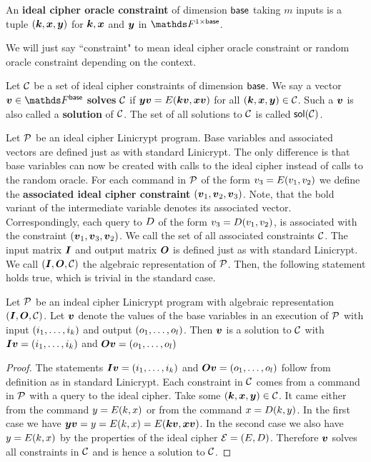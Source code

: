 \begin{defn}
An \textbf{ideal cipher oracle constraint} of dimension $\base$ taking $m$ inputs is a tuple $(\vk, \vx, \vy)$ for
$\vk, \vx$ and $\vy$ in $\F^{1 \times \base}$.
\end{defn}

We will just say ``constraint" to mean ideal cipher oracle constraint or random oracle constraint depending on the context.

\begin{defn}
    Let $\C$ be a set of ideal cipher constraints of dimension $\base$.
    We say a vector $\vv \in \Base$ \textbf{solves} $\C$ if
    $\vy \vv = \E(\vk \vv, \vx \vv)$ for all $(\vk, \vx, \vy) \in \C$.
    Such a $\vv$ is also called a \textbf{solution} of $\C$.
    The set of all solutions to $\C$ is called $\sol(\C)$.
\end{defn}

Let $\P$ be an ideal cipher Linicrypt program.
Base variables and associated vectors are defined just as with standard Linicrypt.
The only difference is that base variables can now be created with calls to the ideal cipher instead of calls to the random oracle.
For each command in $\P$ of the form $v_3 = \E(v_1,v_2)$
we define the \textbf{associated ideal cipher constraint} $(\vv_1, \vv_2, \vv_3)$.
Note, that the bold variant of the intermediate variable denotes its associated vector.
Correspondingly, each query to $\D$ of the form $v_3 = \D(v_1,v_2)$,
is associated with the constraint $(\vv_1, \vv_3, \vv_2)$.
We call the set of all associated constraints $\C$. 
The input matrix $\I$ and output matrix $\O$ is defined just as with standard Linicrypt.
We call $(\I,\O,\C)$ the algebraic representation of $\P$.
Then, the following statement holds true, which is trivial in the standard case.

\begin{lemma}
    Let $\P$ be an indeal cipher Linicrypt program with algebraic representation $(\I,\O,\C)$.
    Let $\vv$ denote the values of the base variables in an execution of $\P$ with input $(\dts i k)$ and output $(\dts o l)$.
    Then $\vv$ is a solution to $\C$ with $\I\vv = (\dts i k)$ and $\O\vv = (\dts o l)$
\end{lemma}

\begin{proof}
    The statements $\I\vv = (\dts i k)$ and $\O\vv = (\dts o l)$ follow from definition as in standard Linicrypt.
    Each constraint in $\C$ comes from a command in $\P$ with a query to the ideal cipher.
    Take some $(\vk, \vx, \vy) \in \C$.
    It came either from the command $y = \E(k, x)$ or from the command $x = \D(k, y)$.
    In the first case we have $\vy\vv = y = \E(k, x) = \E(\vk\vv, \vx\vv)$.
    In the second case we also have $y = \E(k,x)$
    by the properties of the ideal cipher $\mathcal{E} = (\E,\D)$.
    Therefore $\vv$ solves all constraints in $\C$ and is hence a solution to $\C$.
\end{proof}

